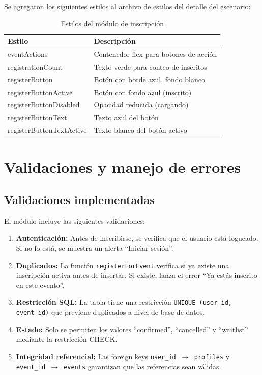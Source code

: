 \documentclass[12pt,letterpaper]{article}
\begin{document}
Se agregaron los siguientes estilos al archivo de estilos del
detalle del escenario:

\begin{table}[H]
\centering
\begin{tabular}{@{}ll@{}}
\toprule
\textbf{Estilo} & \textbf{Descripci\'on} \\
\midrule
eventActions & Contenedor flex para botones de acci\'on \\
registrationCount & Texto verde para conteo de inscritos \\
registerButton & Bot\'on con borde azul, fondo blanco \\
registerButtonActive & Bot\'on con fondo azul (inscrito) \\
registerButtonDisabled & Opacidad reducida (cargando) \\
registerButtonText & Texto azul del bot\'on \\
registerButtonTextActive & Texto blanco del bot\'on activo \\
\bottomrule
\end{tabular}
\caption{Estilos del m\'odulo de inscripci\'on}
\end{table}

\section{Validaciones y manejo de errores}

\subsection{Validaciones implementadas}

El m\'odulo incluye las siguientes validaciones:

\begin{enumerate}
  \item \textbf{Autenticaci\'on:} Antes de inscribirse, se verifica
    que el usuario est\'a logueado. Si no lo est\'a, se muestra un
    alerta ``Iniciar sesi\'on''.

  \item \textbf{Duplicados:} La funci\'on \texttt{registerForEvent}
    verifica si ya existe una inscripci\'on activa antes de insertar.
    Si existe, lanza el error ``Ya est\'as inscrito en este evento''.

  \item \textbf{Restricci\'on SQL:} La tabla tiene una restricci\'on
    \texttt{UNIQUE (user\_id, event\_id)} que previene duplicados
    a nivel de base de datos.

  \item \textbf{Estado:} Solo se permiten los valores ``confirmed'',
    ``cancelled'' y ``waitlist'' mediante la restricci\'on CHECK.

  \item \textbf{Integridad referencial:} Las foreign keys
    \texttt{user\_id $\to$ profiles} y \texttt{event\_id $\to$ events}
    garantizan que las referencias sean v\'alidas.
\end{enumerate}
\end{document}
